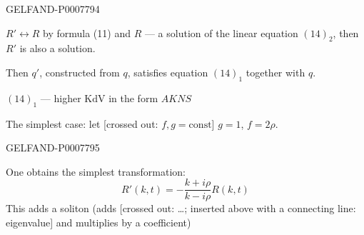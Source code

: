 \begin{GelfandAdjacentEvidence}{GELFAND-P000779}{4}


\(R'\leftrightarrow R\) by formula (11) and \(R\) --- a solution of the linear equation \((14)_2\), then \(R'\) is also a solution.

Then \(q'\), constructed from \(q\), satisfies equation \((14)_1\) together with \(q\).

\((14)_1\) --- higher \(\mathrm{KdV}\) in the form \(AKNS\)

The simplest case: let [crossed out: \(f,g=\mathrm{const}\)] \(g=1\), \(f=2\rho\).
\end{GelfandAdjacentEvidence}
\begin{GelfandAdjacentEvidence}{GELFAND-P000779}{5}


One obtains the simplest transformation:
\begin{equation}
R'(k,t)=-\frac{k+i\rho}{k-i\rho}R(k,t)\tag{15}
\end{equation}
This adds a soliton (adds [crossed out: …; inserted above with a connecting line: eigenvalue] and multiplies by a coefficient)

\end{GelfandAdjacentEvidence}
